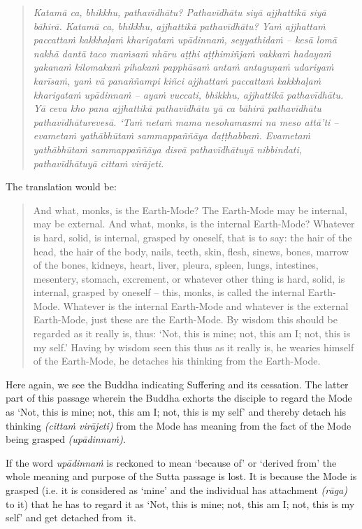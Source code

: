 \begin{quote}
\emph{Katamā ca, bhikkhu, pathavīdhātu? Pathavīdhātu siyā ajjhattikā siyā bāhirā. Katamā ca, bhikkhu, ajjhattikā pathavīdhātu? Yaṁ ajjhattaṁ paccattaṁ kakkhaḷaṁ kharigataṁ upādinnaṁ, seyyathidaṁ -- kesā lomā nakhā dantā taco maṁsaṁ nhāru aṭṭhi aṭṭhimiñjaṁ vakkaṁ hadayaṁ yakanaṁ kilomakaṁ pihakaṁ papphāsaṁ antaṁ antaguṇaṁ udariyaṁ karīsaṁ, yaṁ vā panaññampi kiñci ajjhattaṁ paccattaṁ kakkhaḷaṁ kharigataṁ upādinnaṁ -- ayaṁ vuccati, bhikkhu, ajjhattikā pathavīdhātu. Yā ceva kho pana ajjhattikā pathavīdhātu yā ca bāhirā pathavīdhātu pathavīdhāturevesā. `Taṁ netaṁ mama nesohamasmi na meso attā'ti -- evametaṁ yathābhūtaṁ sammappaññāya daṭṭhabbaṁ. Evametaṁ yathābhūtaṁ sammappaññāya disvā pathavīdhātuyā nibbindati, pathavīdhātuyā cittaṁ virājeti.}
\end{quote}

The translation would be:

\begin{quote}
And what, monks, is the Earth-Mode? The Earth-Mode may be internal, may be external. And what, monks, is the internal Earth-Mode? Whatever is hard, solid, is internal, grasped by oneself, that is to say: the hair of the head, the hair of the body, nails, teeth, skin, flesh, sinews, bones, marrow of the bones, kidneys, heart, liver, pleura, spleen, lungs, intestines, mesentery, stomach, excrement, or whatever other thing is hard, solid, is internal, grasped by oneself -- this, monks, is called the internal Earth-Mode. Whatever is the internal Earth-Mode and whatever is the external Earth-Mode, just these are the Earth-Mode. By wisdom this should be regarded as it really is, thus: `Not, this is mine; not, this am I; not, this is my self.' Having by wisdom seen this thus as it really is, he wearies himself of the Earth-Mode, he detaches his thinking from the Earth-Mode.
\end{quote}

Here again, we see the Buddha indicating Suffering and its cessation. The latter part of this passage wherein the Buddha exhorts the disciple to regard the Mode as `Not, this is mine; not, this am I; not, this is my self' and thereby detach his thinking \emph{(cittaṁ virājeti)} from the Mode has meaning  from the fact of the Mode being grasped \emph{(upādinnaṁ)}.

If the word \emph{upādinnaṁ} is reckoned to mean `because of' or `derived from' the whole meaning and purpose of the Sutta passage is lost. It is because the Mode is grasped (i.e. it is considered as `mine' and the individual has attachment \emph{(rāga)} to it) that he has to regard it as `Not, this is mine; not, this am I; not, this is my self' and get detached from~it.

